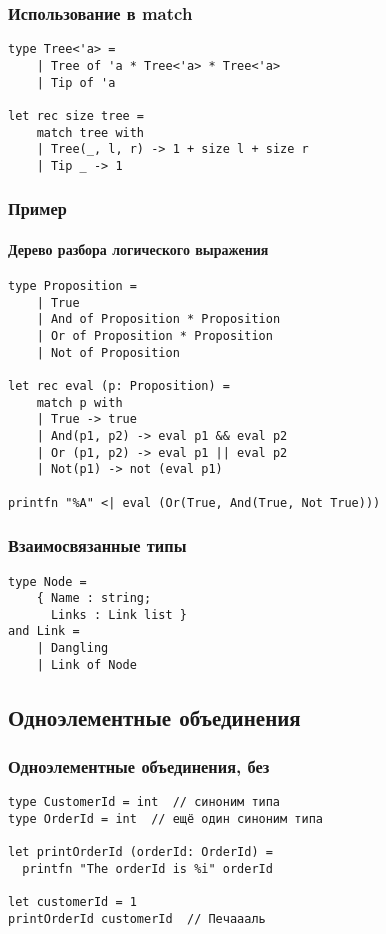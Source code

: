 \documentclass[xetex,mathserif,serif]{beamer}
\begin{document}
    \begin{frame}[fragile]
        \frametitle{Использование в match}
        \begin{verbatim}
type Tree<'a> =
    | Tree of 'a * Tree<'a> * Tree<'a>
    | Tip of 'a

let rec size tree =
    match tree with
    | Tree(_, l, r) -> 1 + size l + size r
    | Tip _ -> 1
        \end{verbatim}
    \end{frame}

    \begin{frame}[fragile]
        \frametitle{Пример}
        \framesubtitle{Дерево разбора логического выражения}
        \begin{verbatim}
type Proposition =
    | True
    | And of Proposition * Proposition
    | Or of Proposition * Proposition
    | Not of Proposition

let rec eval (p: Proposition) =
    match p with
    | True -> true
    | And(p1, p2) -> eval p1 && eval p2
    | Or (p1, p2) -> eval p1 || eval p2
    | Not(p1) -> not (eval p1)

printfn "%A" <| eval (Or(True, And(True, Not True)))
        \end{verbatim}
    \end{frame}

    \begin{frame}[fragile]
        \frametitle{Взаимосвязанные типы}
        \begin{verbatim}
type Node =
    { Name : string;
      Links : Link list }
and Link =
    | Dangling
    | Link of Node
        \end{verbatim}
    \end{frame}

    \subsection{Одноэлементные объединения}

    \begin{frame}[fragile]
        \frametitle{Одноэлементные объединения, без}
        \begin{verbatim}
type CustomerId = int  // синоним типа
type OrderId = int  // ещё один синоним типа

let printOrderId (orderId: OrderId) =
  printfn "The orderId is %i" orderId

let customerId = 1  
printOrderId customerId  // Печаааль
        \end{verbatim}
    \end{frame}
\end{document}
